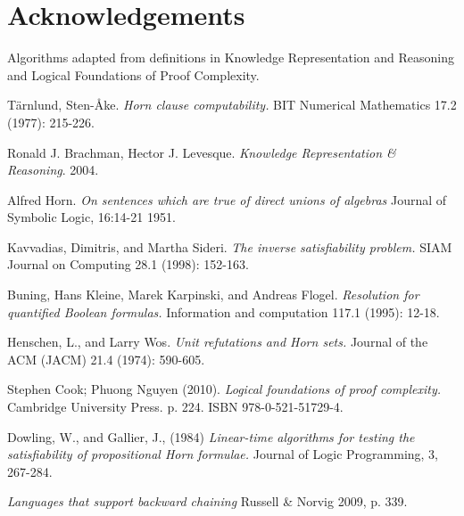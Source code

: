 \documentclass{article}
\begin{document}
\section{Acknowledgements}

Algorithms adapted from definitions in Knowledge Representation and
Reasoning\cite{krr} and Logical Foundations of Proof Complexity\cite{proofcomp}.

\begin{thebibliography}{9}

  Tärnlund, Sten-Åke.
  \emph{Horn clause computability.} 
  BIT Numerical Mathematics 17.2 (1977): 215-226.

  Ronald J. Brachman, Hector J. Levesque.
  \emph{Knowledge Representation \& Reasoning}.
  2004.

  Alfred Horn.
  \emph{On sentences which are true of direct unions of algebras}
  Journal of Symbolic Logic, 16:14-21
  1951.

  Kavvadias, Dimitris, and Martha Sideri. 
  \emph{The inverse satisfiability problem.}
  SIAM Journal on Computing 28.1 (1998): 152-163.

  Buning, Hans Kleine, Marek Karpinski, and Andreas Flogel. 
  \emph{Resolution for quantified Boolean formulas.} 
  Information and computation 117.1 (1995): 12-18.

  Henschen, L., and Larry Wos. 
  \emph{Unit refutations and Horn sets.} 
  Journal of the ACM (JACM) 21.4 (1974): 590-605.

  Stephen Cook; Phuong Nguyen (2010). 
  \emph{Logical foundations of proof complexity.}
  Cambridge University Press. p. 224. ISBN 978-0-521-51729-4.

  Dowling, W., and Gallier, J., (1984) 
  \emph{Linear-time algorithms for testing the satisfiability of propositional Horn formulae.}
  Journal of Logic Programming, 3, 267-284.

  \emph{Languages that support backward chaining}
  Russell \& Norvig 2009, p. 339.

\end{thebibliography}
\end{document}
